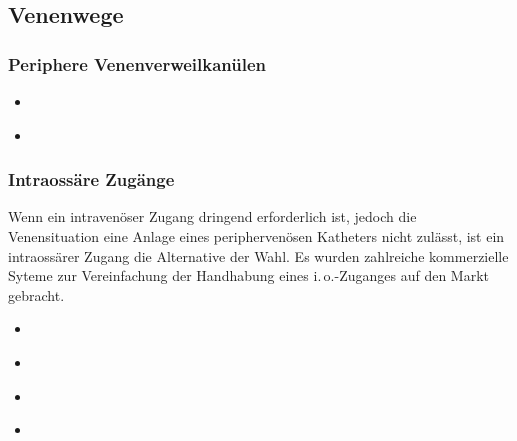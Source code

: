 \subsection{Venenwege}

\subsubsection{Periphere Venenverweilkanülen}

{%

}
{%
\begin{itemize}
  \item
\end{itemize}
}

{%

}
{%
\begin{itemize}
  \item
\end{itemize}
}

\subsubsection{Intraossäre Zugänge}

{%
Wenn ein intravenöser Zugang dringend erforderlich ist,
jedoch die Venensituation eine Anlage eines periphervenösen Katheters nicht 
zulässt,
ist ein intraossärer Zugang die Alternative der Wahl.
%
Es wurden zahlreiche kommerzielle Syteme zur Vereinfachung der Handhabung eines 
i.\,o.-Zuganges auf den Markt gebracht.
}
{%
\begin{itemize}
  \item
\end{itemize}
}

{%

}
{%
\begin{itemize}
  \item
\end{itemize}
}

{%

}
{%
\begin{itemize}
  \item
\end{itemize}
}

{%

}
{%
\begin{itemize}
  \item
\end{itemize}
}


